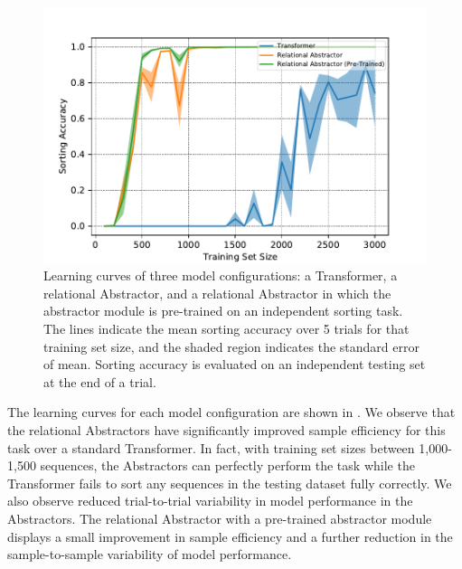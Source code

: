 \begin{figure}[t!]
	\centering
	\includegraphics[width=.8\textwidth]{figures/random_object_argsort_learning_curves.pdf}
	\caption{Learning curves of three model configurations: a Transformer, a relational Abstractor, and a relational Abstractor in which the abstractor module is pre-trained on an independent sorting task. The lines indicate the mean sorting accuracy over 5 trials for that training set size, and the shaded region indicates the standard error of mean. Sorting accuracy is evaluated on an independent testing set at the end of a trial.}
	\label{fig:random_object_argsort_learning_curves}
\end{figure}


The learning curves for each model configuration are shown in . We observe that the relational Abstractors have significantly improved sample efficiency for this task over a standard Transformer. In fact, with training set sizes between 1,000-1,500 sequences, the Abstractors can perfectly perform the task while the Transformer fails to sort any sequences in the testing dataset fully correctly. We also observe reduced trial-to-trial variability in model performance in the Abstractors. The relational Abstractor with a pre-trained abstractor module displays a small improvement in sample efficiency and a further reduction in the sample-to-sample variability of model performance.

